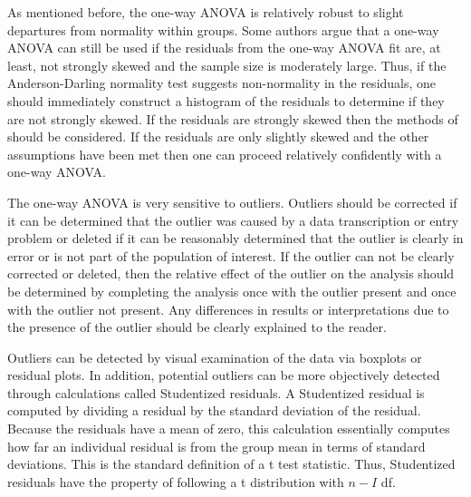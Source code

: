 \documentclass[10pt,openany]{book}\usepackage[]{graphicx}\usepackage[]{color}
\begin{document}

As mentioned before, the one-way ANOVA is relatively robust to slight departures from normality within groups.  Some authors argue that a one-way ANOVA can still be used if the residuals from the one-way ANOVA fit are, at least, not strongly skewed and the sample size is moderately large.  Thus, if the Anderson-Darling normality test suggests non-normality in the residuals, one should immediately construct a histogram of the residuals to determine if they are not strongly skewed.  If the residuals are strongly skewed then the methods of  should be considered.  If the residuals are only slightly skewed and the other assumptions have been met then one can proceed relatively confidently with a one-way ANOVA.


The one-way ANOVA is very sensitive to outliers.  Outliers should be corrected if it can be determined that the outlier was caused by a data transcription or entry problem or deleted if it can be reasonably determined that the outlier is clearly in error or is not part of the population of interest.  If the outlier can not be clearly corrected or deleted, then the relative effect of the outlier on the analysis should be determined by completing the analysis once with the outlier present and once with the outlier not present.  Any differences in results or interpretations due to the presence of the outlier should be clearly explained to the reader.


\vspace{-12pt}

Outliers can be detected by visual examination of the data via boxplots or residual plots.  In addition, potential outliers can be more objectively detected through calculations called Studentized residuals.  A Studentized residual is computed by dividing a residual by the standard deviation of the residual.  Because the residuals have a mean of zero, this calculation essentially computes how far an individual residual is from the group mean in terms of standard deviations.  This is the standard definition of a t test statistic.  Thus, Studentized residuals have the property of following a t distribution with $n-I$ df.
\end{document}
